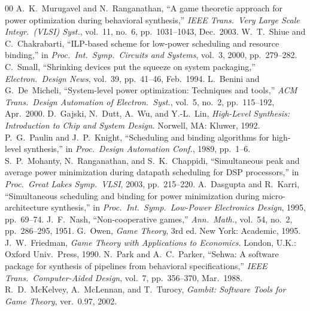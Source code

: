 \documentclass[conference]{IEEEtran}
\begin{document}
\begin{thebibliography}{00}
A.~K.~Murugavel and N.~Ranganathan, ``A game theoretic approach for power optimization during behavioral synthesis,'' \textit{IEEE Trans.\ Very Large Scale Integr.\ (VLSI) Syst.}, vol.~11, no.~6, pp.~1031--1043, Dec.\ 2003.
W.~T.~Shiue and C.~Chakrabarti, ``ILP-based scheme for low-power scheduling and resource binding,'' in \textit{Proc.\ Int.\ Symp.\ Circuits and Systems}, vol.~3, 2000, pp.~279--282.
C.~Small, ``Shrinking devices put the squeeze on system packaging,'' \textit{Electron.\ Design News}, vol.~39, pp.~41--46, Feb.\ 1994.
L.~Benini and G.~De~Micheli, ``System-level power optimization: Techniques and tools,'' \textit{ACM Trans.\ Design Automation of Electron.\ Syst.}, vol.~5, no.~2, pp.~115--192, Apr.\ 2000.
D.~Gajski, N.~Dutt, A.~Wu, and Y.-L.~Lin, \textit{High-Level Synthesis: Introduction to Chip and System Design}. Norwell, MA: Kluwer, 1992.
P.~G.~Paulin and J.~P.~Knight, ``Scheduling and binding algorithms for high-level synthesis,'' in \textit{Proc.\ Design Automation Conf.}, 1989, pp.~1--6.
S.~P.~Mohanty, N.~Ranganathan, and S.~K.~Chappidi, ``Simultaneous peak and average power minimization during datapath scheduling for DSP processors,'' in \textit{Proc.\ Great Lakes Symp.\ VLSI}, 2003, pp.~215--220.
A.~Dasgupta and R.~Karri, ``Simultaneous scheduling and binding for power minimization during micro-architecture synthesis,'' in \textit{Proc.\ Int.\ Symp.\ Low-Power Electronics Design}, 1995, pp.~69--74.
J.~F.~Nash, ``Non-cooperative games,'' \textit{Ann.\ Math.}, vol.~54, no.~2, pp.~286--295, 1951.
G.~Owen, \textit{Game Theory}, 3rd ed. New York: Academic, 1995.
J.~W.~Friedman, \textit{Game Theory with Applications to Economics}. London, U.K.: Oxford Univ.\ Press, 1990.
N.~Park and A.~C.~Parker, ``Sehwa: A software package for synthesis of pipelines from behavioral specifications,'' \textit{IEEE Trans.\ Computer-Aided Design}, vol.~7, pp.~356--370, Mar.\ 1988.
R.~D.~McKelvey, A.~McLennan, and T.~Turocy, \textit{Gambit: Software Tools for Game Theory}, ver.\ 0.97, 2002.
\end{thebibliography}
\end{document}
